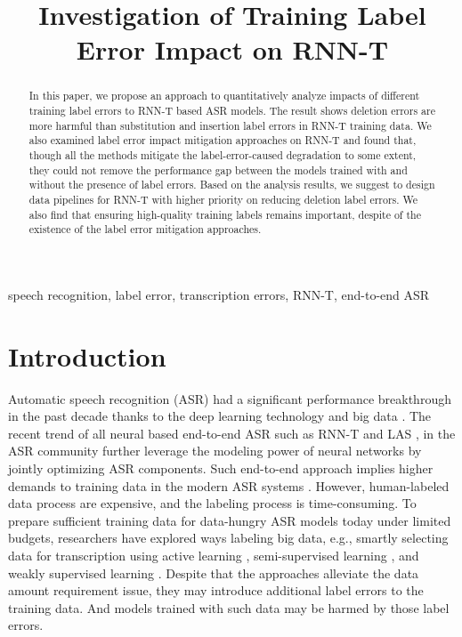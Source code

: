 \documentclass{article}
\title{Investigation of Training Label Error Impact on RNN-T}
\begin{document}
%
\maketitle
%
\begin{abstract}
In this paper, we propose an approach to quantitatively analyze impacts of different training label errors to RNN-T based ASR models. The result shows deletion errors are more harmful than substitution and insertion label errors in RNN-T training data. We also examined label error impact mitigation approaches on RNN-T and found that, though all the methods mitigate the label-error-caused degradation to some extent, they could not remove the performance gap between the models trained with and without the presence of label errors. Based on the analysis results, we suggest to design data pipelines for RNN-T with higher priority on reducing deletion label errors. We also find that ensuring high-quality training labels remains important, despite of the existence of the label error mitigation approaches.
\end{abstract}
%
\begin{keywords}
speech recognition, label error, transcription errors, RNN-T, end-to-end ASR
\end{keywords}
%
\section{Introduction}
Automatic speech recognition (ASR) had a significant performance breakthrough \cite{Xiong2017} in the past decade thanks to the deep learning technology and big data \cite{Xiong2017}. The recent trend of all neural based end-to-end ASR such as RNN-T \cite{Graves2012,He} and LAS \cite{Chan}, in the ASR community further leverage the modeling power of neural networks by jointly optimizing ASR components. Such end-to-end approach implies higher demands to training data in the modern ASR systems \cite{Kaplan2020,Henighan2020}. However, human-labeled data process are expensive, and the labeling process is time-consuming. To prepare sufficient training data for data-hungry ASR models today under limited budgets, researchers have explored ways labeling big data, e.g., smartly selecting data for transcription using active learning \cite{Riccardi2005,Drugman}, semi-supervised learning \cite{Drugman,Vesely2013}, and weakly supervised learning \cite{Zhou2018a}. Despite that the approaches alleviate the data amount requirement issue, they may introduce additional label errors to the training data. And models trained with such data may be harmed by those label errors. 
\end{document}
